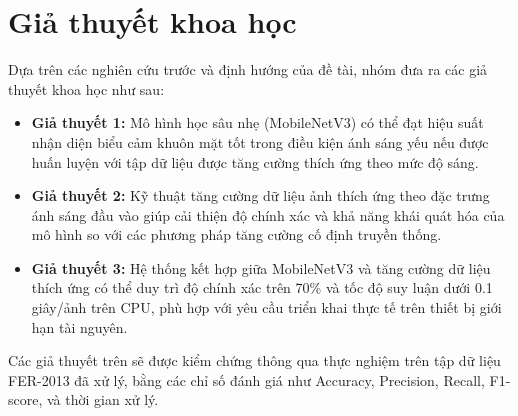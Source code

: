 \section{Giả thuyết khoa học} %

Dựa trên các nghiên cứu trước và định hướng của đề tài, nhóm đưa ra các giả thuyết khoa học như sau:

\begin{itemize}
    \item \textbf{Giả thuyết 1:} Mô hình học sâu nhẹ (MobileNetV3) có thể đạt hiệu suất nhận diện biểu cảm khuôn mặt tốt trong điều kiện ánh sáng yếu nếu được huấn luyện với tập dữ liệu được tăng cường thích ứng theo mức độ sáng.
    
    \item \textbf{Giả thuyết 2:} Kỹ thuật tăng cường dữ liệu ảnh thích ứng theo đặc trưng ánh sáng đầu vào giúp cải thiện độ chính xác và khả năng khái quát hóa của mô hình so với các phương pháp tăng cường cố định truyền thống.
    
    \item \textbf{Giả thuyết 3:} Hệ thống kết hợp giữa MobileNetV3 và tăng cường dữ liệu thích ứng có thể duy trì độ chính xác trên 70\% và tốc độ suy luận dưới 0.1 giây/ảnh trên CPU, phù hợp với yêu cầu triển khai thực tế trên thiết bị giới hạn tài nguyên.
\end{itemize}

Các giả thuyết trên sẽ được kiểm chứng thông qua thực nghiệm trên tập dữ liệu FER-2013 đã xử lý, bằng các chỉ số đánh giá như Accuracy, Precision, Recall, F1-score, và thời gian xử lý.